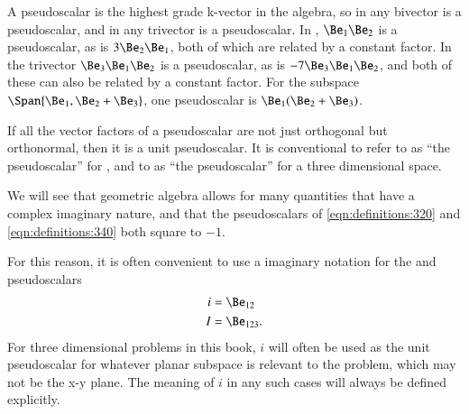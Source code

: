 %
%

A pseudoscalar is the highest grade k-vector in the algebra, so in
 any bivector is a pseudoscalar, and in  any trivector is a pseudoscalar.
In , \( \Be_1 \Be_2 \) is a pseudoscalar, as is \( 3 \Be_2 \Be_1 \), both of which are related by a constant factor.
In  the trivector \( \Be_3 \Be_1 \Be_2 \) is a pseudoscalar, as is \( - 7 \Be_3 \Be_1 \Be_2 \), and both of these can also be related by a constant factor.
For the subspace \( \Span{ \Be_1, \Be_2 + \Be_3} \), one pseudoscalar is \( \Be_1(\Be_2 + \Be_3) \).

If all the vector factors of a pseudoscalar are not just orthogonal but orthonormal, then it is a unit pseudoscalar.
It is conventional to refer to
as ``the pseudoscalar'' for , and to
as ``the pseudoscalar'' for a three dimensional space.

We will see that geometric algebra allows for many quantities that have a complex imaginary nature, and that the pseudoscalars of \cref{eqn:definitions:320} and \cref{eqn:definitions:340} both square to \(-1\).

For this reason, it is often convenient to use a imaginary notation for the  and  pseudoscalars
\begin{dmath}\label{eqn:multivector_nomenclature:42}
\begin{aligned}
i &= \Be_{12} \\
I &= \Be_{123}.
\end{aligned}
\end{dmath}
For three dimensional problems in this book, \( i \) will often be used as the unit pseudoscalar for whatever planar subspace is relevant to the problem, which may not be the x-y plane.
The meaning of \( i \) in any such cases will always be defined explicitly.

